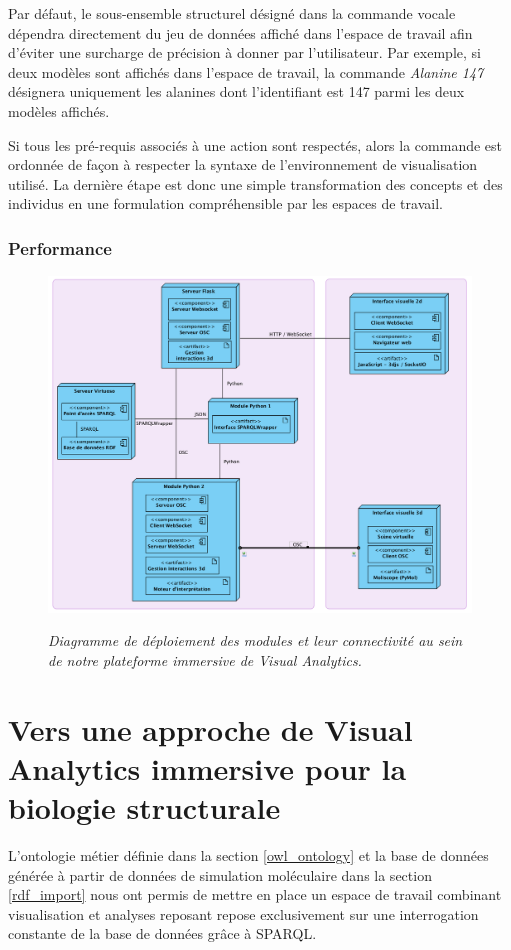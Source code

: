 Par défaut, le sous-ensemble structurel désigné dans la commande vocale dépendra directement du jeu de données affiché dans l'espace de travail afin d'éviter une surcharge de précision à donner par l'utilisateur. Par exemple, si deux modèles sont affichés dans l'espace de travail, la commande \textit{Alanine 147} désignera uniquement les alanines dont l'identifiant est 147 parmi les deux modèles affichés.

Si tous les pré-requis associés à une action sont respectés, alors la commande est ordonnée de façon à respecter la syntaxe de l'environnement de visualisation utilisé. La dernière étape est donc une simple transformation des concepts et des individus en une formulation compréhensible par les espaces de travail.

\subsubsection{Performance}




\begin{figure}
  \centering
  {\includegraphics[width=.75\linewidth]{./figures/ch5/platform_architecture}}
    \caption{{\it Diagramme de déploiement des modules et leur connectivité au sein de notre plateforme immersive de Visual Analytics.}}
  \label{Fig:platform_architecture}
  \hspace{0.3cm}
\end{figure}


\section{Vers une approche de Visual Analytics immersive pour la biologie structurale}

L'ontologie métier définie dans la section \ref{owl_ontology} et la base de données générée à partir de données de simulation moléculaire dans la section \ref{rdf_import} nous ont permis de mettre en place un espace de travail combinant visualisation et analyses reposant repose exclusivement sur une interrogation constante de la base de données grâce à SPARQL.

